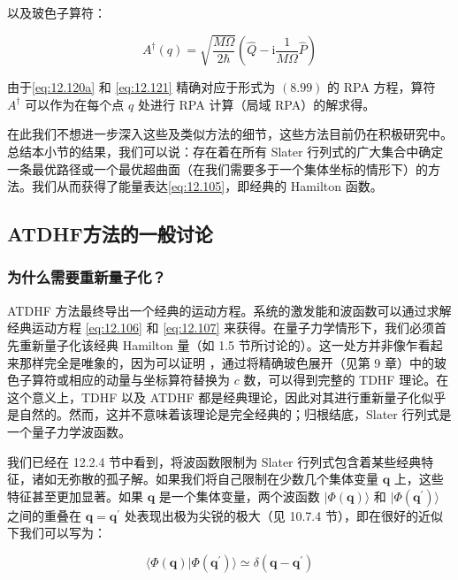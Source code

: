 以及玻色子算符：

\begin{equation}
A^{\dagger}(q)=\sqrt{\frac{M\Omega}{2\hbar}}\left(\hat{Q}-\mathrm{i}\frac{1}{M\Omega}\hat{P}\right)\label{eq:12.123}
\end{equation}

由于\ref{eq:12.120a} 和 \ref{eq:12.121} 精确对应于形式为 $(8.99)$ 的 RPA 方程，算符
$A^{\dagger}$ 可以作为在每个点 $q$ 处进行 RPA 计算（局域 RPA）的解求得。

在此我们不想进一步深入这些及类似方法的细节，这些方法目前仍在积极研究中。总结本小节的结果，我们可以说：存在着在所有 Slater 行列式的广大集合中确定一条最优路径或一个最优超曲面（在我们需要多于一个集体坐标的情形下）的方法。我们从而获得了能量表达\ref{eq:12.105}，即经典的
Hamilton 函数。

\subsection{ATDHF方法的一般讨论\label{subsec:12.3.5}}

\subsubsection{为什么需要重新量子化？}

ATDHF 方法最终导出一个经典的运动方程。系统的激发能和波函数可以通过求解经典运动方程 \ref{eq:12.106} 和 \ref{eq:12.107}
来获得。在量子力学情形下，我们必须首先重新量子化该经典 Hamilton 量（如 1.5 节所讨论的）。这一处方并非像乍看起来那样完全是唯象的，因为可以证明
\cite{MH72,BM78}，通过将精确玻色展开（见第 9 章）中的玻色子算符或相应的动量与坐标算符替换为 $c$ 数，可以得到完整的
TDHF 理论。在这个意义上，TDHF 以及 ATDHF 都是经典理论，因此对其进行重新量子化似乎是自然的。然而，这并不意味着该理论是完全经典的；归根结底，Slater
行列式是一个量子力学波函数。

我们已经在 12.2.4 节中看到，将波函数限制为 Slater 行列式包含着某些经典特征，诸如无弥散的孤子解。如果我们将自己限制在少数几个集体变量
$\boldsymbol{q}$ 上，这些特征甚至更加显著。如果 $\boldsymbol{q}$ 是一个集体变量，两个波函数
$|\Phi(\boldsymbol{q})\rangle$ 和 $|\Phi(\boldsymbol{q}^{\prime})\rangle$
之间的重叠在 $\boldsymbol{q}=\boldsymbol{q}^{\prime}$ 处表现出极为尖锐的极大（见 10.7.4
节），即在很好的近似下我们可以写为：

\begin{equation}
\langle\Phi(\boldsymbol{q})|\Phi(\boldsymbol{q}^{\prime})\rangle\simeq\delta(\boldsymbol{q}-\boldsymbol{q}^{\prime})\label{eq:12.124}
\end{equation}

